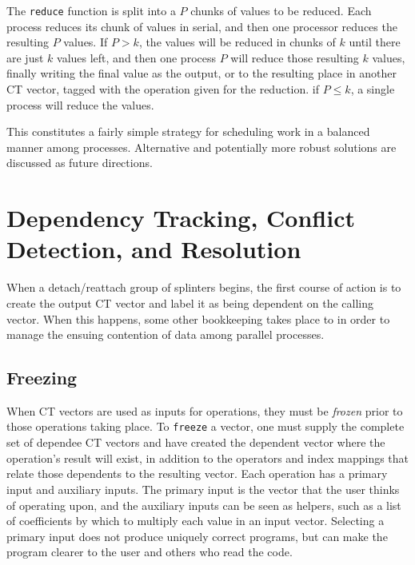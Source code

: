 The \texttt{reduce} function is split into a $P$ chunks of values to be reduced.
Each process reduces its chunk of values in serial, and then one processor
reduces the resulting $P$ values. If $P > k$, the values will be
reduced in chunks of $k$ until there are just $k$ values left, and then one
process $P$ will reduce those resulting $k$ values, finally writing the final
value as the output, or to the resulting place in another CT vector, tagged
with the operation given for the reduction. if $P \leq k$, a single process will
reduce the values.

This constitutes a fairly simple strategy for scheduling work in a balanced
manner among processes. Alternative and potentially more robust solutions are
discussed as future directions.

\section{Dependency Tracking, Conflict Detection, and Resolution}
When a detach/reattach group of splinters begins, the first course of action is
to create the output CT vector and label it as being dependent on the calling
vector. When this happens, some other bookkeeping takes place to in order to
manage the ensuing contention of data among parallel processes.

\subsection{Freezing}
When CT vectors are used as inputs for operations, they must be \textit{frozen}
prior to those operations taking place. To \texttt{freeze} a vector, one must
supply the complete set of dependee CT vectors and have created the dependent
vector where the operation's result will exist, in addition to the operators and
index mappings that relate those dependents to the resulting vector. Each
operation has a primary input and auxiliary inputs. The primary input is the
vector that the user thinks of operating upon, and the auxiliary inputs can be
seen as helpers, such as a list of coefficients by which to multiply each value
in an input vector. Selecting a primary input does not produce uniquely correct
programs, but can make the program clearer to the user and others who read the
code.

